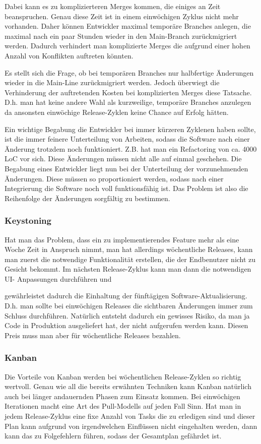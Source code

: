 Dabei kann es zu komplizierteren Merges kommen, die einiges an Zeit
beanspruchen. Genau diese Zeit ist in einem einwöchigen Zyklus nicht mehr
vorhanden. Daher können Entwickler maximal temporäre Branches anlegen, die
maximal nach ein paar Stunden wieder in den Main-Branch zurückmigriert werden.
Dadurch verhindert man komplizierte Merges die aufgrund einer hohen Anzahl von
Konflikten auftreten könnten.

Es stellt sich die Frage, ob bei temporären Branches nur halbfertige
Änderungen wieder in die Main-Line zurückmigriert werden. Jedoch überwiegt die
Verhinderung der auftretenden Kosten bei komplizierten Merges diese Tatsache.
D.h. man hat keine andere Wahl als kurzweilige, temporäre Branches anzulegen
da ansonsten einwöchige Release-Zyklen keine Chance auf Erfolg hätten.

Ein wichtige Begabung die Entwickler bei immer kürzeren Zyklenen haben sollte,
ist die immer feinere Unterteilung von Arbeiten, sodass die Software nach
einer Änderung trotzdem noch funktioniert. Z.B. hat man ein Refactoring von
ca. 4000 LoC vor sich. Diese Änderungen müssen nicht alle auf einmal
geschehen. Die Begabung eines Entwickler liegt nun bei der Unterteilung der
vorzunehmenden Änderungen. Diese müssen so proportioniert werden, sodass nach
einer Integrierung die Software noch voll funktionsfähig ist. Das Problem ist
also die Reihenfolge der Änderungen sorgfältig zu bestimmen.

\subsubsection{Keystoning}
Hat man das Problem, dass ein zu implementierendes Feature mehr als eine Woche
Zeit in Anspruch nimmt, man hat allerdings wöchentliche Releases, kann man
zuerst die notwendige Funktionalität erstellen, die der Endbenutzer nicht zu
Gesicht bekommt. Im nächsten Release-Zyklus kann man dann die notwendigen UI-
Anpassungen durchführen und

gewährleistet dadurch die Einhaltung der fünftägigen Software-Aktualisierung.
D.h. man sollte bei einwöchigen Releases die sichtbaren Änderungen immer zum
Schluss durchführen. Natürlich entsteht dadurch ein gewisses Risiko, da man ja
Code in Produktion ausgeliefert hat, der nicht aufgerufen werden kann. Diesen
Preis muss man aber für wöchentliche Releases bezahlen.

\subsubsection{Kanban}
Die Vorteile von Kanban werden bei wöchentlichen Release-Zyklen so richtig
wertvoll. Genau wie all die bereits erwähnten Techniken kann Kanban natürlich
auch bei länger andauernden Phasen zum Einsatz kommen. Bei einwöchigen
Iterationen macht eine Art des Pull-Modells auf jeden Fall Sinn. Hat man in
jedem Release-Zyklus eine fixe Anzahl von Tasks die zu erledigen sind und
dieser Plan kann aufgrund von irgendwelchen Einflüssen nicht eingehalten
werden, dann kann das zu Folgefehlern führen, sodass der Gesamtplan gefährdet
ist.

